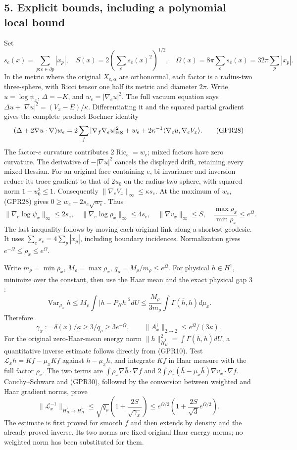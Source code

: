 \documentclass[11pt]{article}
\begin{document}
\subsection*{5. Explicit bounds, including a polynomial local bound}

Set
\[
 s_e(x)=\sum_{p:e\in\partial p}|x_p|,\quad
 S(x)=2\left(\sum_es_e(x)^2\right)^{1/2},\quad
 \Omega(x)=8\pi\sum_es_e(x)=32\pi\sum_p|x_p|.
 \tag{GPR27}
\]
In the metric where the original \(X_{e,\alpha}\) are orthonormal, each factor is a radius-two three-sphere, with Ricci tensor one half its metric and diameter \(2\pi\). Write \(u=\log\psi_x\), \(\Delta=-K\), and \(w_e=|\nabla_eu|^2\). The full vacuum equation says \(\Delta u+|\nabla u|^2=(V_x-E)/\kappa\). Differentiating it and the squared partial gradient gives the complete product Bochner identity
\[
 (\Delta+2\nabla u\cdot\nabla)w_e
 =2\sum_f|\nabla_f\nabla_eu|_{\rm HS}^2+w_e
       +2\kappa^{-1}\langle\nabla_eu,\nabla_eV_x\rangle.
 \tag{GPR28}
\]
The factor-\(e\) curvature contributes \(2\operatorname{Ric}_e=w_e\); mixed factors have zero curvature. The derivative of \(-|\nabla u|^2\) cancels the displayed drift, retaining every mixed Hessian. For an original face containing \(e\), bi-invariance and inversion reduce its trace gradient to that of \(2u_0\) on the radius-two sphere, with squared norm \(1-u_0^2\le1\). Consequently \(\|\nabla_eV_x\|_\infty\le\kappa s_e\). At the maximum of \(w_e\), (GPR28) gives \(0\ge w_e-2s_e\sqrt{w_e}\). Thus
\[
 \|\nabla_e\log\psi_x\|_\infty\le2s_e,
 \quad\|\nabla_e\log\rho_x\|_\infty\le4s_e,
 \quad\|\nabla v_x\|_\infty\le S,
 \quad\frac{\max\rho_x}{\min\rho_x}\le e^\Omega.
 \tag{GPR29}
\]
The last inequality follows by moving each original link along a shortest geodesic. It uses \(\sum_es_e=4\sum_p|x_p|\), including boundary incidences. Normalization gives \(e^{-\Omega}\le\rho_x\le e^\Omega\).

Write \(m_\rho=\min\rho_x\), \(M_\rho=\max\rho_x\), \(q_\rho=M_\rho/m_\rho\le e^\Omega\). For physical \(h\in H^1\), minimize over the constant, then use the Haar mean and the exact physical gap \(3\):
\[
 \operatorname{Var}_{\mu_x}h
 \le M_\rho\int|h-P_Hh|^2dU
 \le\frac{M_\rho}{3m_\rho}\int\Gamma(\bar h,h)d\mu_x.
\]
Therefore
\[
 \gamma_x:=\delta(x)/\kappa\ge3/q_\rho\ge3e^{-\Omega},\qquad
 \|A_x^\dagger\|_{2\to2}\le e^\Omega/(3\kappa).
 \tag{GPR30}
\]
For the original zero-Haar-mean energy norm \(\|h\|_{\dot H^1_H}^2=\int\Gamma(\bar h,h)dU\), a quantitative inverse estimate follows directly from (GPR10). Test \(\mathcal L_xh=Kf-\mu_xKf\) against \(h-\mu_xh\), and integrate \(Kf\) in Haar measure with the full factor \(\rho_x\). The two terms are \(\int\rho_x\nabla\bar h\cdot\nabla f\) and \(2\int\rho_x(\bar h-\mu_x\bar h)\nabla v_x\cdot\nabla f\). Cauchy–Schwarz and (GPR30), followed by the conversion between weighted and Haar gradient norms, prove
\[
 \boxed{\|\mathscr L_x^{-1}\|_{\dot H^1_H\to\dot H^1_H}
 \le\sqrt{q_\rho}\left(1+\frac{2S}{\sqrt{\gamma_x}}\right)
 \le e^{\Omega/2}\left(1+\frac{2S}{\sqrt3}e^{\Omega/2}\right).}
 \tag{GPR31}
\]
The estimate is first proved for smooth \(f\) and then extends by density and the already proved inverse. Its two norms are fixed original Haar energy norms; no weighted norm has been substituted for them.
\end{document}
